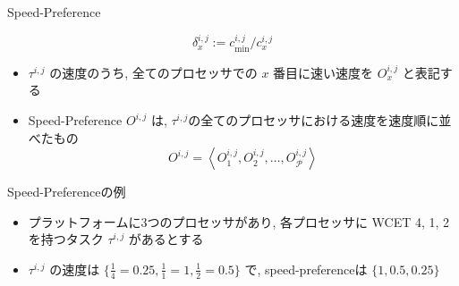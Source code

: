\begin{frame}{Speed-Preference}
    \begin{definition}
        \begin{equation}
            \delta_x^{i, j}:=c_{\min }^{i, j} / c_x^{i, j}
        \end{equation}
    \end{definition}
    \begin{definition}
        \setlength{\linewidth}{0.98\columnwidth}
        \begin{itemize}
            \item $\tau^{i,j}$ の速度のうち, 全てのプロセッサでの $x$ 番目に速い速度を $O_x^{i,j}$ と表記する
            \item Speed-Preference $O^{i, j}$ は, $\tau^{i,j}$の全てのプロセッサにおける速度を速度順に並べたもの
                  \begin{equation}
                      O^{i, j}=\left\langle O_1^{i, j}, O_2^{i, j}, \ldots, O_{\mathcal{P}}^{i, j}\right\rangle
                  \end{equation}
        \end{itemize}
    \end{definition}
\end{frame}

\begin{frame}{Speed-Preferenceの例}
    \begin{itemize}
        \item プラットフォームに3つのプロセッサがあり, 各プロセッサに WCET {4, 1, 2} を持つタスク $\tau^{i,j}$ があるとする
        \item $\tau^{i,j}$ の速度は $\{\frac{1}{4}=0.25, \frac{1}{1}=1, \frac{1}{2}=0.5\}$ で, speed-preferenceは $\{1, 0.5, 0.25\}$
    \end{itemize}
\end{frame}
